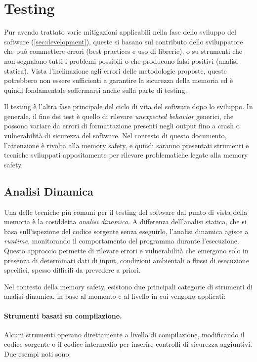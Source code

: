 \section{Testing}
\label{sec:testing}

Pur avendo trattato varie mitigazioni applicabili nella fase dello sviluppo del software
(\autoref{sec:development}), queste si basano sul contributo dello sviluppatore
che può commettere errori (best practices e uso di librerie), o su strumenti che
non segnalano tutti i problemi possibili o che producono falsi positivi (analisi
statica). Vista l'inclinazione agli errori delle metodologie proposte, queste potrebbero
non essere sufficienti a garantire la sicurezza della memoria ed è quindi fondamentale
soffermarsi anche sulla parte di testing.

Il testing è l'altra fase principale del ciclo di vita del software dopo lo sviluppo.
In generale, il fine dei test è quello di rilevare \textit{unexpected behavior}
generici, che possono variare da errori di formattazione presenti negli output fino
a crash o vulnerabilità di sicurezza del software. Nel contesto di questo
documento, l'attenzione è rivolta alla memory safety, e quindi saranno
presentati strumenti e tecniche sviluppati appositamente per rilevare
problematiche legate alla memory safety.

\subsection{Analisi Dinamica}
\label{sec:analisi-dinamica}

Una delle tecniche più comuni per il testing del software dal punto di vista della
memoria è la cosiddetta \textit{analisi dinamica}. A differenza dell'analisi statica,
che si basa sull'ispezione del codice sorgente senza eseguirlo, l'analisi dinamica
agisce a \textit{runtime}, monitorando il comportamento del programma durante l'esecuzione.
Questo approccio permette di rilevare errori e vulnerabilità che emergono solo
in presenza di determinati dati di input, condizioni ambientali o flussi di esecuzione
specifici, spesso difficili da prevedere a priori.

Nel contesto della memory safety, esistono due principali categorie di strumenti
di analisi dinamica, in base al momento e al livello in cui vengono applicati:

\paragraph{Strumenti basati su compilazione.}
Alcuni strumenti operano direttamente a livello di compilazione, modificando il
codice sorgente o il codice intermedio per inserire controlli di sicurezza
aggiuntivi. Due esempi noti sono:

